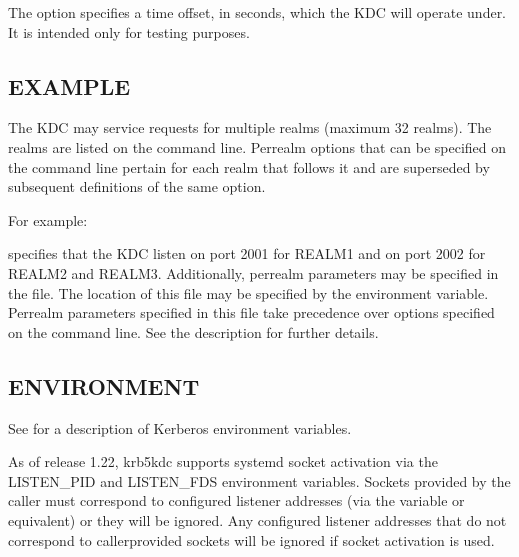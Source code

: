 \documentclass[letterpaper,10pt,english]{sphinxmanual}
\begin{document}
\sphinxAtStartPar
The   option specifies a time offset, in seconds, which
the KDC will operate under.  It is intended only for testing purposes.


\subsection{EXAMPLE}
\label{\detokenize{admin/admin_commands/krb5kdc:example}}
\sphinxAtStartPar
The KDC may service requests for multiple realms (maximum 32 realms).
The realms are listed on the command line.  Per\sphinxhyphen{}realm options that can
be specified on the command line pertain for each realm that follows
it and are superseded by subsequent definitions of the same option.

\sphinxAtStartPar
For example:

\begin{sphinxVerbatim}[commandchars=\\\{\}]
          
\end{sphinxVerbatim}

\sphinxAtStartPar
specifies that the KDC listen on port 2001 for REALM1 and on port 2002
for REALM2 and REALM3.  Additionally, per\sphinxhyphen{}realm parameters may be
specified in the {\hyperref[\detokenize{admin/conf_files/kdc_conf:kdc-conf-5}]{}} file.  The location of this file
may be specified by the  environment variable.
Per\sphinxhyphen{}realm parameters specified in this file take precedence over
options specified on the command line.  See the {\hyperref[\detokenize{admin/conf_files/kdc_conf:kdc-conf-5}]{}}
description for further details.


\subsection{ENVIRONMENT}
\label{\detokenize{admin/admin_commands/krb5kdc:environment}}
\sphinxAtStartPar
See  for a description of Kerberos environment
variables.

\sphinxAtStartPar
As of release 1.22, krb5kdc supports systemd socket activation via the
LISTEN\_PID and LISTEN\_FDS environment variables.  Sockets provided by
the caller must correspond to configured listener addresses (via the
 variable or equivalent) or they will be ignored.  Any
configured listener addresses that do not correspond to
caller\sphinxhyphen{}provided sockets will be ignored if socket activation is used.
\end{document}
